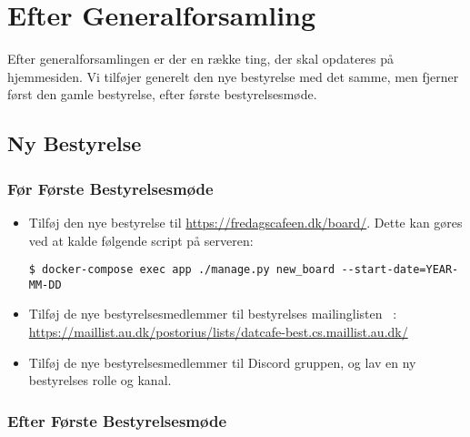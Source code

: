 \section{Efter Generalforsamling}
\label{sec:efter-generalforsamling}

Efter generalforsamlingen er der en række ting, der skal opdateres på hjemmesiden.
Vi tilføjer generelt den nye bestyrelse med det samme, men fjerner først den gamle bestyrelse, 
efter første bestyrelsesmøde.

\subsection{Ny Bestyrelse}
\label{sec:ny-bestyrelse}

\subsubsection{Før Første Bestyrelsesmøde}
\label{sec:foer-foerste-bestyrelsesmoede}

\begin{itemize}
    \item Tilføj den nye bestyrelse til \url{https://fredagscafeen.dk/board/}. 
    Dette kan gøres ved at kalde følgende script på serveren:
    {\small\begin{verbatim}
$ docker-compose exec app ./manage.py new_board --start-date=YEAR-MM-DD\end{verbatim}}
    \item Tilføj de nye bestyrelsesmedlemmer til bestyrelses mailinglisten \bestmail~:\\
    {\small\url{https://maillist.au.dk/postorius/lists/datcafe-best.cs.maillist.au.dk/}}
    \item Tilføj de nye bestyrelsesmedlemmer til Discord gruppen, og lav en ny bestyrelses rolle og kanal.
\end{itemize}

\subsubsection{Efter Første Bestyrelsesmøde}
\label{sec:efter-foerste-bestyrelsesmoede}

